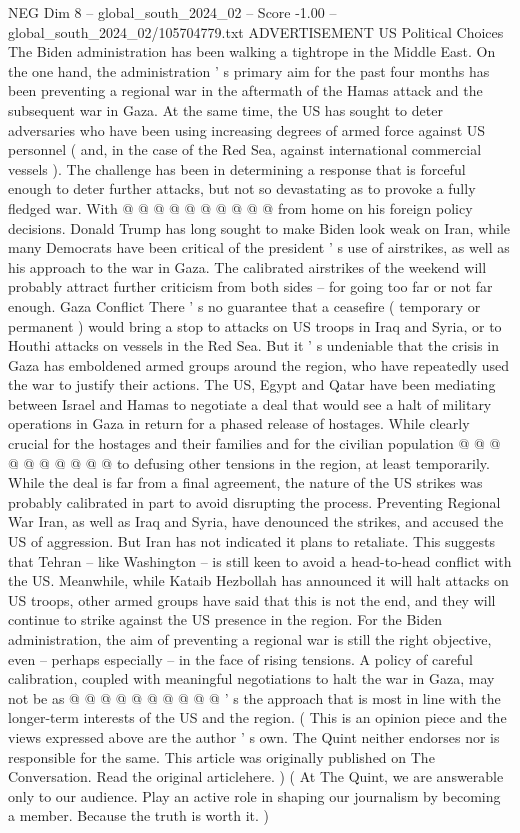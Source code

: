\begin{textsample}{NEG Dim 8 – global\_south\_2024\_02 – Score -1.00 – global\_south\_2024\_02/105704779.txt}
ADVERTISEMENT US Political Choices The Biden administration has been walking a tightrope in the Middle East.
On the one hand, the administration ' s primary aim for the past four months has been preventing a regional war in the aftermath of the Hamas attack and the subsequent war in Gaza.
At the same time, the US has sought to deter adversaries who have been using increasing degrees of armed force against US personnel ( and, in the case of the Red Sea, against international commercial vessels ).
The challenge has been in determining a response that is forceful enough to deter further attacks, but not so devastating as to provoke a fully fledged war.
With @ @ @ @ @ @ @ @ @ @ from home on his foreign policy decisions.
Donald Trump has long sought to make Biden look weak on Iran, while many Democrats have been critical of the president ' s use of airstrikes, as well as his approach to the war in Gaza.
The calibrated airstrikes of the weekend will probably attract further criticism from both sides -- for going too far or not far enough.
Gaza Conflict There ' s no guarantee that a ceasefire ( temporary or permanent ) would bring a stop to attacks on US troops in Iraq and Syria, or to Houthi attacks on vessels in the Red Sea.
But it ' s undeniable that the crisis in Gaza has emboldened armed groups around the region, who have repeatedly used the war to justify their actions.
The US, Egypt and Qatar have been mediating between Israel and Hamas to negotiate a deal that would see a halt of military operations in Gaza in return for a phased release of hostages.
While clearly crucial for the hostages and their families and for the civilian population @ @ @ @ @ @ @ @ @ @ to defusing other tensions in the region, at least temporarily.
While the deal is far from a final agreement, the nature of the US strikes was probably calibrated in part to avoid disrupting the process.
Preventing Regional War Iran, as well as Iraq and Syria, have denounced the strikes, and accused the US of aggression.
But Iran has not indicated it plans to retaliate.
This suggests that Tehran -- like Washington -- is still keen to avoid a head-to-head conflict with the US.
Meanwhile, while Kataib Hezbollah has announced it will halt attacks on US troops, other armed groups have said that this is not the end, and they will continue to strike against the US presence in the region.
For the Biden administration, the aim of preventing a regional war is still the right objective, even -- perhaps especially -- in the face of rising tensions.
A policy of careful calibration, coupled with meaningful negotiations to halt the war in Gaza, may not be as @ @ @ @ @ @ @ @ @ @ ' s the approach that is most in line with the longer-term interests of the US and the region. ( This is an opinion piece and the views expressed above are the author ' s own.
The Quint neither endorses nor is responsible for the same.
This article was originally published on The Conversation.
Read the original articlehere. ) ( At The Quint, we are answerable only to our audience.
Play an active role in shaping our journalism by becoming a member.
Because the truth is worth it. )

\end{textsample}
